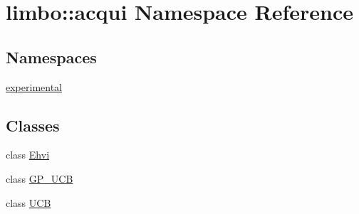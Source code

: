 \hypertarget{namespacelimbo_1_1acqui}{}\section{limbo\+:\+:acqui Namespace Reference}
\label{namespacelimbo_1_1acqui}
\subsection*{Namespaces}
\begin{DoxyCompactItemize}
\item 
 \hyperlink{namespacelimbo_1_1acqui_1_1experimental}{experimental}
\end{DoxyCompactItemize}
\subsection*{Classes}
\begin{DoxyCompactItemize}
\item 
class \hyperlink{classlimbo_1_1acqui_1_1_ehvi}{Ehvi}
\item 
class \hyperlink{classlimbo_1_1acqui_1_1_g_p___u_c_b}{G\+P\+\_\+\+U\+C\+B}
\item 
class \hyperlink{classlimbo_1_1acqui_1_1_u_c_b}{U\+C\+B}
\end{DoxyCompactItemize}
